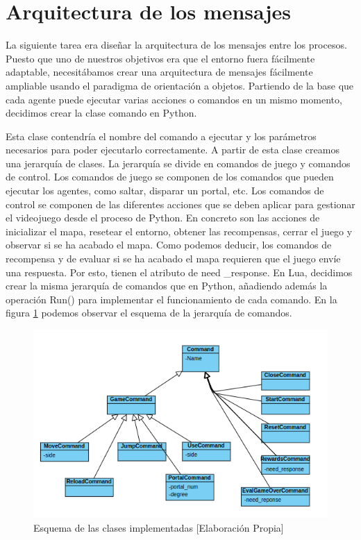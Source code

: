 \section{Arquitectura de los mensajes}

La siguiente tarea era diseñar la arquitectura de los mensajes entre los procesos. Puesto que uno de nuestros objetivos era que el entorno fuera fácilmente adaptable, necesitábamos crear una arquitectura de mensajes fácilmente ampliable usando el paradigma de orientación a objetos. Partiendo de la base que cada agente puede ejecutar varias acciones o comandos en un mismo momento, decidimos crear la clase comando en Python.

Esta clase contendría el nombre del comando a ejecutar y los parámetros necesarios para poder ejecutarlo correctamente. A partir de esta clase creamos una jerarquía de clases. La jerarquía se divide en comandos de juego y comandos de control. Los comandos de juego se componen de los comandos que pueden ejecutar los agentes, como saltar, disparar un portal, etc. Los comandos de control se componen de las diferentes acciones que se deben aplicar para gestionar el videojuego desde el proceso de Python. En concreto son las acciones de inicializar el mapa, resetear el entorno, obtener las recompensas, cerrar el juego y observar si se ha acabado el mapa. Como podemos deducir, los comandos de recompensa y de evaluar si se ha acabado el mapa requieren que el juego envíe una respuesta. Por esto, tienen el atributo de need \_response. En Lua, decidimos crear la misma jerarquía de comandos que en Python, añadiendo además la operación Run() para implementar el funcionamiento de cada comando. En la figura \ref {fig:clases} podemos observar el esquema de la jerarquía de comandos.

\begin{figure}[ht]
    \centering
    \includegraphics[width=1.0\textwidth]{img/clases.png}
    \caption{Esquema de las clases implementadas [Elaboración Propia]}
    \label{fig:clases}
\end{figure}


